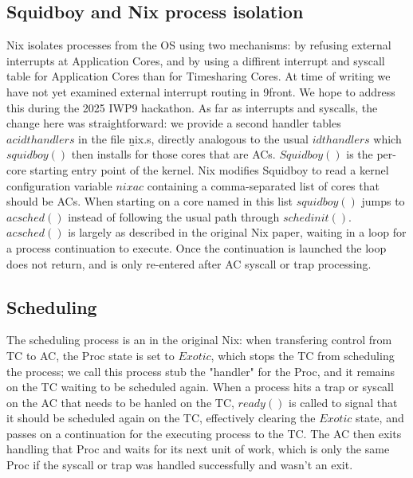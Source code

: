 \documentclass{article}
\begin{document}
\subsection{Squidboy and Nix process isolation}
Nix isolates processes from the OS using two mechanisms: by refusing external interrupts at Application Cores, and by using a diffirent interrupt and syscall table for Application Cores than for Timesharing Cores.
At time of writing we have not yet examined external interrupt routing in 9front. We hope to address this during the 2025 IWP9 hackathon.
As far as interrupts and syscalls, the change here was straightforward: we provide a second handler tables $acidthandlers$ in the file {\b nix.s}, directly analogous to the usual $idthandlers$ which $squidboy()$ then installs for those cores that are ACs.
$Squidboy()$ is the per-core starting entry point of the kernel.
Nix modifies Squidboy to read a kernel configuration variable $nixac$ containing a comma-separated list of cores that should be ACs.
When starting on a core named in this list $squidboy()$ jumps to $acsched()$ instead of following the usual path through $schedinit()$.
$acsched()$ is largely as described in the original Nix paper, waiting in a loop for a process continuation to execute.  
Once the continuation is launched the loop does not return, and is only re-entered after AC syscall or trap processing.

\subsection{Scheduling}
The scheduling process is an in the original Nix: when transfering control from TC to AC, the Proc state is set to $Exotic$, which stops the TC from scheduling the process; we call this process stub the "handler" for the Proc, and it remains on the TC waiting to be scheduled again.
When a process hits a trap or syscall on the AC that needs to be hanled on the TC, $ready()$ is called to signal that it should be scheduled again on the TC, effectively clearing the $Exotic$ state, and passes on a continuation for the executing process to the TC. 
The AC then exits handling that Proc and waits for its next unit of work, which is only the same Proc if the syscall or trap was handled successfully and wasn't an exit.
\end{document}
